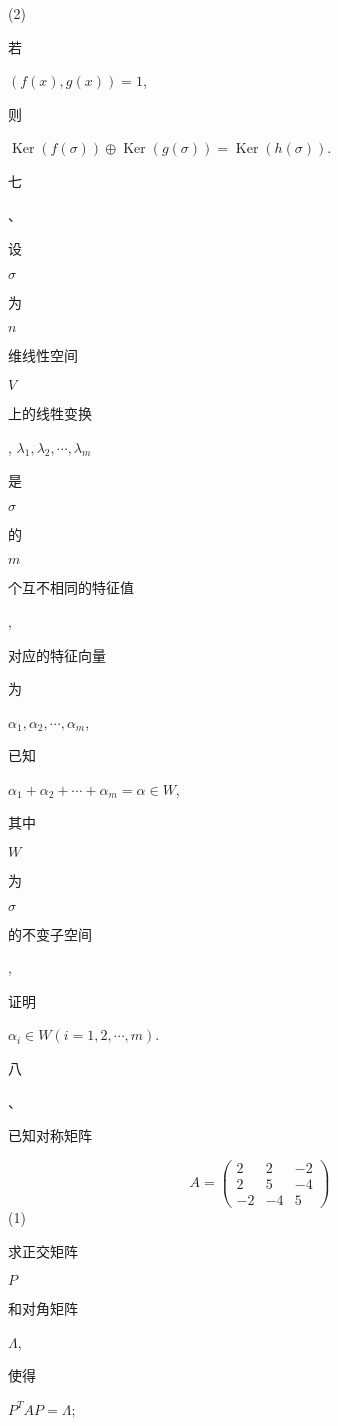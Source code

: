 \documentclass[10pt]{article}
\begin{document}
(2) \begin{CJK}{UTF8}{mj}若\end{CJK} $(f(x), g(x))=1$, \begin{CJK}{UTF8}{mj}则\end{CJK} $\operatorname{Ker}(f(\sigma)) \oplus \operatorname{Ker}(g(\sigma))=\operatorname{Ker}(h(\sigma))$.

\begin{CJK}{UTF8}{mj}七\end{CJK}、\begin{CJK}{UTF8}{mj}设\end{CJK} $\sigma$ \begin{CJK}{UTF8}{mj}为\end{CJK} $n$ \begin{CJK}{UTF8}{mj}维线性空间\end{CJK} $V$ \begin{CJK}{UTF8}{mj}上的线牲变换\end{CJK}, $\lambda_{1}, \lambda_{2}, \cdots, \lambda_{m}$ \begin{CJK}{UTF8}{mj}是\end{CJK} $\sigma$ \begin{CJK}{UTF8}{mj}的\end{CJK} $m$ \begin{CJK}{UTF8}{mj}个互不相同的特征值\end{CJK}, \begin{CJK}{UTF8}{mj}对应的特征向量\end{CJK} \begin{CJK}{UTF8}{mj}为\end{CJK} $\alpha_{1}, \alpha_{2}, \cdots, \alpha_{m}$, \begin{CJK}{UTF8}{mj}已知\end{CJK} $\alpha_{1}+\alpha_{2}+\cdots+\alpha_{m}=\alpha \in W$, \begin{CJK}{UTF8}{mj}其中\end{CJK} $W$ \begin{CJK}{UTF8}{mj}为\end{CJK} $\sigma$ \begin{CJK}{UTF8}{mj}的不变子空间\end{CJK}, \begin{CJK}{UTF8}{mj}证明\end{CJK} $\alpha_{i} \in W(i=1,2, \cdots, m)$.

\begin{CJK}{UTF8}{mj}八\end{CJK}、\begin{CJK}{UTF8}{mj}已知对称矩阵\end{CJK}
$$
A=\left(\begin{array}{ccc}
2 & 2 & -2 \\
2 & 5 & -4 \\
-2 & -4 & 5
\end{array}\right)
$$
(1) \begin{CJK}{UTF8}{mj}求正交矩阵\end{CJK} $P$ \begin{CJK}{UTF8}{mj}和对角矩阵\end{CJK} $\Lambda$, \begin{CJK}{UTF8}{mj}使得\end{CJK} $P^{T} A P=\Lambda$;
\end{document}
